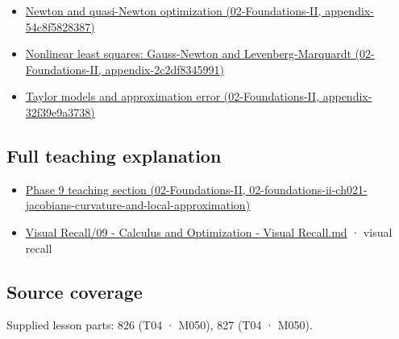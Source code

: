 \begin{itemize}
\tightlist
\item
  \href{../02-Foundations-II/main.pdf\#nameddest=appendix-54c8f5828387}{Newton and quasi-Newton optimization (02-Foundations-II, appendix-54c8f5828387)}
\item
  \href{../02-Foundations-II/main.pdf\#nameddest=appendix-2c2df8345991}{Nonlinear least squares: Gauss-Newton and Levenberg-Marquardt (02-Foundations-II, appendix-2c2df8345991)}
\item
  \href{../02-Foundations-II/main.pdf\#nameddest=appendix-32f39e9a3738}{Taylor models and approximation error (02-Foundations-II, appendix-32f39e9a3738)}
\end{itemize}

\subsection{Full teaching explanation}\label{appendix-6ac071f8b50c-full-teaching-explanation}

\begin{itemize}
\tightlist
\item
  \href{../02-Foundations-II/main.pdf\#nameddest=02-foundations-ii-ch021-jacobians-curvature-and-local-approximation}{Phase 9 teaching section (02-Foundations-II, 02-foundations-ii-ch021-jacobians-curvature-and-local-approximation)}
\item
  \hyperref[appendix-adf48f5dc5c1]{Visual Recall/09 - Calculus and Optimization - Visual Recall.md} · visual recall
\end{itemize}

\subsection{Source coverage}\label{appendix-6ac071f8b50c-source-coverage}

Supplied lesson parts: 826 (T04 · M050), 827 (T04 · M050).
